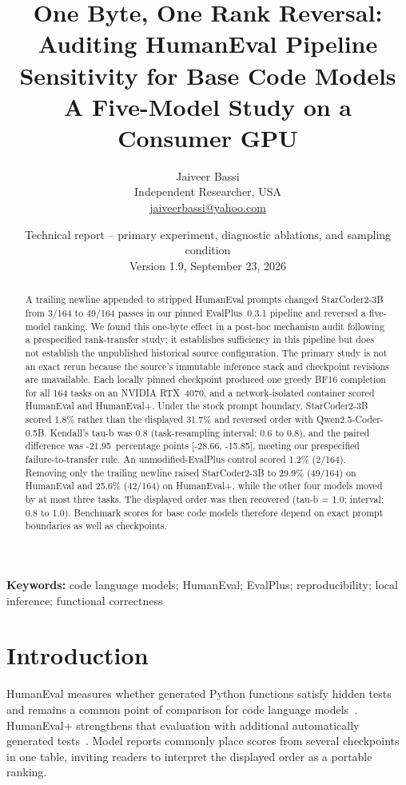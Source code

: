 \documentclass[10pt,twocolumn]{article}
\title{\vspace{-1.5em}\textbf{One Byte, One Rank Reversal:}\\
\textbf{Auditing HumanEval Pipeline Sensitivity for Base Code Models}\\
\large A Five-Model Study on a Consumer GPU}
\author{Jaiveer Bassi\\
\small Independent Researcher, USA\\
\small \href{mailto:jaiveerbassi@yahoo.com}{jaiveerbassi@yahoo.com}}
\date{\small Technical report -- primary experiment, diagnostic ablations, and sampling condition\\Version 1.9, September 23, 2026}
\newcommand{\pp}{percentage points}
\begin{document}
\maketitle
\thispagestyle{fancy}

\begin{abstract}
A trailing newline appended to stripped HumanEval prompts changed StarCoder2-3B from 3/164 to 49/164 passes in our pinned EvalPlus~0.3.1 pipeline and reversed a five-model ranking. We found this one-byte effect in a post-hoc mechanism audit following a prespecified rank-transfer study; it establishes sufficiency in this pipeline but does not establish the unpublished historical source configuration. The primary study is not an exact rerun because the source's immutable inference stack and checkpoint revisions are unavailable. Each locally pinned checkpoint produced one greedy BF16 completion for all 164 tasks on an NVIDIA RTX~4070, and a network-isolated container scored HumanEval and HumanEval+. Under the stock prompt boundary, StarCoder2-3B scored 1.8\% rather than the displayed 31.7\% and reversed order with Qwen2.5-Coder-0.5B. Kendall's tau-b was 0.8 (task-resampling interval: 0.6 to 0.8), and the paired difference was -21.95~\pp{} [-28.66, -15.85], meeting our prespecified failure-to-transfer rule. An unmodified-EvalPlus control scored 1.2\% (2/164). Removing only the trailing newline raised StarCoder2-3B to 29.9\% (49/164) on HumanEval and 25.6\% (42/164) on HumanEval+, while the other four models moved by at most three tasks. The displayed order was then recovered (tau-b = 1.0; interval: 0.8 to 1.0). Benchmark scores for base code models therefore depend on exact prompt boundaries as well as checkpoints.
\end{abstract}

\noindent\textbf{Keywords:} code language models; HumanEval; EvalPlus; reproducibility; local inference; functional correctness

\section{Introduction}

HumanEval measures whether generated Python functions satisfy hidden tests and remains a common point of comparison for code language models~\citep{chen2021humaneval}. HumanEval+ strengthens that evaluation with additional automatically generated tests~\citep{liu2023evalplus}. Model reports commonly place scores from several checkpoints in one table, inviting readers to interpret the displayed order as a portable ranking.
\end{document}
